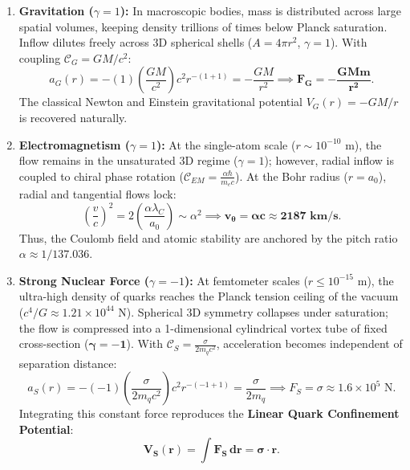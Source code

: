 \begin{enumerate}
    \item \textbf{Gravitation ($\gamma = 1$):} In macroscopic bodies, mass is distributed across large spatial volumes, keeping density trillions of times below Planck saturation. Inflow dilutes freely across 3D spherical shells ($A = 4\pi r^2$, $\gamma = 1$). With coupling $\mathcal{C}_G = GM/c^2$:
          \begin{equation}
              a_G(r) = -(1) \left(\frac{GM}{c^2}\right) c^2 r^{-(1+1)} = -\frac{GM}{r^2} \implies \mathbf{F_G = -\frac{G M m}{r^2}}.
          \end{equation}
          The classical Newton and Einstein gravitational potential $V_G(r) = -GM/r$ is recovered naturally.

    \item \textbf{Electromagnetism ($\gamma = 1$):} At the single-atom scale ($r \sim 10^{-10}\text{ m}$), the flow remains in the unsaturated 3D regime ($\gamma = 1$); however, radial inflow is coupled to chiral phase rotation ($\mathcal{C}_{EM} = \frac{\alpha \hbar}{m_e c}$). At the Bohr radius ($r = a_0$), radial and tangential flows lock:
          \begin{equation}
              \left(\frac{v}{c}\right)^2 = 2\left(\frac{\alpha \lambda_C}{a_0}\right) \sim \alpha^2 \implies \mathbf{v_\theta = \alpha c \approx 2187\text{ km/s}}.
          \end{equation}
          Thus, the Coulomb field and atomic stability are anchored by the pitch ratio $\alpha \approx 1/137.036$.

    \item \textbf{Strong Nuclear Force ($\gamma = -1$):} At femtometer scales ($r \le 10^{-15}\text{ m}$), the ultra-high density of quarks reaches the Planck tension ceiling of the vacuum ($c^4/G \approx 1.21 \times 10^{44}\text{ N}$). Spherical 3D symmetry collapses under saturation; the flow is compressed into a 1-dimensional cylindrical vortex tube of fixed cross-section ($\mathbf{\gamma = -1}$). With $\mathcal{C}_S = \frac{\sigma}{2 m_q c^2}$, acceleration becomes independent of separation distance:
          \begin{equation}
              a_S(r) = -(-1) \left(\frac{\sigma}{2 m_q c^2}\right) c^2 r^{-(-1+1)} = \frac{\sigma}{2 m_q} \implies F_S = \sigma \approx 1.6 \times 10^5\text{ N}.
          \end{equation}
          Integrating this constant force reproduces the \textbf{Linear Quark Confinement Potential}:
          \begin{equation}
              \mathbf{V_S(r) = \int F_S \, dr = \sigma \cdot r}.
          \end{equation}


\end{enumerate}
